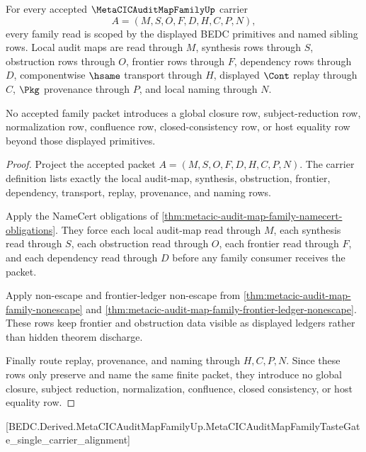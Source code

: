 \begin{theorem}
\label{thm:metacic-audit-map-family-primitive-scope}
For every accepted $\MetaCICAuditMapFamilyUp$ carrier
$$
A=(M,S,O,F,D,H,C,P,N),
$$
every family read is scoped by the displayed BEDC primitives and named sibling rows. Local audit maps are read through $M$, synthesis rows through $S$, obstruction rows through $O$, frontier rows through $F$, dependency rows through $D$, componentwise $\hsame$ transport through $H$, displayed $\Cont$ replay through $C$, $\Pkg$ provenance through $P$, and local naming through $N$.

No accepted family packet introduces a global closure row, subject-reduction row, normalization row, confluence row, closed-consistency row, or host equality row beyond those displayed primitives.
\end{theorem}
\begin{proof}
Project the accepted packet $A=(M,S,O,F,D,H,C,P,N)$. The carrier definition lists exactly the local audit-map, synthesis, obstruction, frontier, dependency, transport, replay, provenance, and naming rows.

Apply the NameCert obligations of \autoref{thm:metacic-audit-map-family-namecert-obligations}. They force each local audit-map read through $M$, each synthesis read through $S$, each obstruction read through $O$, each frontier read through $F$, and each dependency read through $D$ before any family consumer receives the packet.

Apply non-escape and frontier-ledger non-escape from \autoref{thm:metacic-audit-map-family-nonescape} and \autoref{thm:metacic-audit-map-family-frontier-ledger-nonescape}. These rows keep frontier and obstruction data visible as displayed ledgers rather than hidden theorem discharge.

Finally route replay, provenance, and naming through $H,C,P,N$. Since these rows only preserve and name the same finite packet, they introduce no global closure, subject reduction, normalization, confluence, closed consistency, or host equality row.
\end{proof}

[BEDC.Derived.MetaCICAuditMapFamilyUp.MetaCICAuditMapFamilyTasteGate\_single\_carrier\_alignment]


